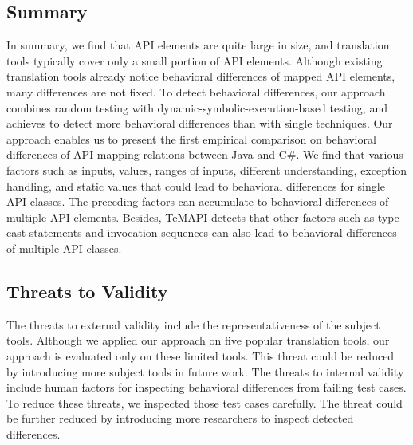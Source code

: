 \subsection{Summary}
\label{sec:evaluation:summary}
In summary, we find that API elements are quite large in size, and translation tools typically cover only a small portion of API elements. Although existing translation tools already notice behavioral differences of mapped API elements, many differences are not fixed. To detect behavioral differences, our approach combines random testing with dynamic-symbolic-execution-based testing, and achieves to detect more behavioral differences than with single techniques. Our approach enables us to present the first empirical comparison on behavioral differences of API mapping relations between Java and C\#. We find that various factors such as  inputs,  values, ranges of inputs, different understanding, exception handling, and static values that could lead to behavioral differences for single API classes. The preceding factors can accumulate to behavioral differences of multiple API elements. Besides, TeMAPI detects that other factors such as type cast statements and invocation sequences can also lead to behavioral differences of multiple API classes.
\subsection{Threats to Validity}
\label{sec:evaluation:threat}
The threats to external validity include the representativeness of the subject tools. Although we applied
our approach on five popular translation tools, our approach is evaluated only on these limited tools. This threat could be reduced by introducing more subject tools in future work. The threats to internal validity include human factors for inspecting behavioral differences from failing test cases. To reduce these threats, we inspected those test cases carefully. The threat could be further
reduced by introducing more researchers to inspect detected differences.
